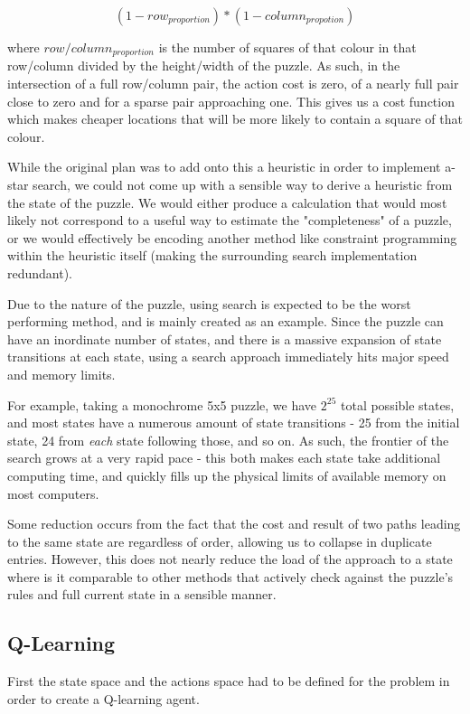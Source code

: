 \documentclass{svproc}
\begin{document}
$$ (1 - row_{proportion}) * (1 - column_{propotion}) $$

where $row/column_{proportion}$ is the number of squares of that colour in that row/column divided by the height/width of the puzzle.
As such, in the intersection of a full row/column pair, the action cost is zero, of a nearly full pair close to zero and for a sparse pair approaching one.
This gives us a cost function which makes cheaper locations that will be more likely to contain a square of that colour.

While the original plan was to add onto this a heuristic in order to implement a-star search, we could not come up with a sensible way to derive a heuristic from the state of the puzzle.
We would either produce a calculation that would most likely not correspond to a useful way to estimate the "completeness" of a puzzle, or we would effectively be encoding another method like constraint programming within the heuristic itself (making the surrounding search implementation redundant).

Due to the nature of the puzzle, using search is expected to be the worst performing method, and is mainly created as an example.
Since the puzzle can have an inordinate number of states, and there is a massive expansion of state transitions at each state, using a search approach immediately hits major speed and memory limits.

For example, taking a monochrome 5x5 puzzle, we have $2^{25}$ total possible states, and most states have a numerous amount of state transitions - 25 from the initial state, 24 from \textit{each} state following those, and so on.
As such, the frontier of the search grows at a very rapid pace - this both makes each state take additional computing time, and quickly fills up the physical limits of available memory on most computers.

Some reduction occurs from the fact that the cost and result of two paths leading to the same state are regardless of order, allowing us to collapse in duplicate entries.
However, this does not nearly reduce the load of the approach to a state where is it comparable to other methods that actively check against the puzzle's rules and full current state in a sensible manner.

\subsection{Q-Learning}
First the state space and the actions space had to be defined for the problem in order to create a Q-learning agent.
\end{document}
